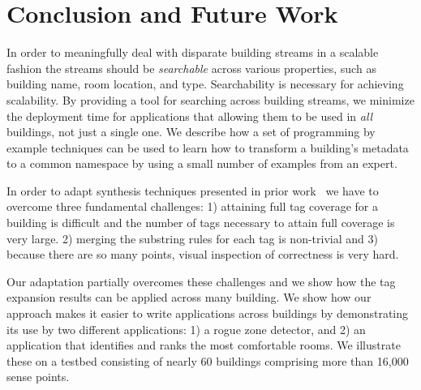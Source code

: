 \section{Conclusion and Future Work}


In order to meaningfully deal with disparate building streams in a scalable 
fashion the streams should be \emph{searchable} across various properties, such
as building name, room location, and type.
Searchability is necessary for achieving scalability.  By providing a tool for
searching across building streams, we minimize the deployment time for applications that 
allowing them to be used in \emph{all} buildings, not just a single one.  
We describe how a set of programming by example techniques can be used to
learn how to transform a building's metadata 
to a common namespace by using a small number of examples from an expert. 

In order to adapt synthesis techniques presented in prior work~\cite{Gulwani:2011} 
we have to overcome
three fundamental challenges: 1) attaining full tag coverage for a building
is difficult and the number of tags necessary to attain full coverage is very large.
2) merging the substring rules for each tag is non-trivial and 3) because there are so
many points, visual inspection of correctness is very hard.

Our adaptation partially overcomes these challenges and we show how the tag expansion results can
be applied across many building.
We show how our approach makes it easier to write applications across buildings by
demonstrating its use by two different applications: 1) a rogue zone detector, and 
2) an application that identifies and ranks the most comfortable
rooms. We illustrate these on a testbed consisting of nearly 60 buildings comprising more 
than 16,000 sense points.




